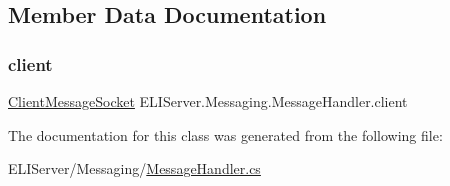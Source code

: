 \subsection{Member Data Documentation}
\mbox{\label{class_e_l_i_server_1_1_messaging_1_1_message_handler_a0373b287a964b75f145c12031d28accd}} 
\subsubsection{\texorpdfstring{client}{client}}
{\footnotesize\ttfamily \hyperlink{class_e_l_i_server_1_1_messaging_1_1_client_message_socket}{Client\+Message\+Socket} E\+L\+I\+Server.\+Messaging.\+Message\+Handler.\+client\hspace{0.3cm}{\ttfamily [private]}}



The documentation for this class was generated from the following file\+:\begin{DoxyCompactItemize}
\item 
E\+L\+I\+Server/\+Messaging/\hyperlink{_message_handler_8cs}{Message\+Handler.\+cs}\end{DoxyCompactItemize}
